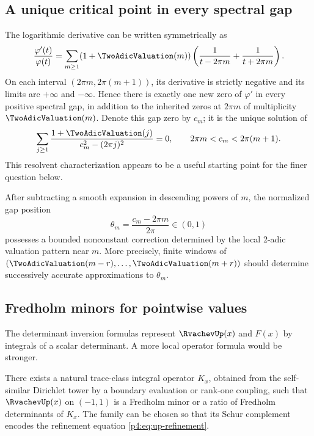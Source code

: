 \documentclass[11pt]{article}
\theoremstyle{definition}
\theoremstyle{remark}
\newcommand{\phiF}{\varphi}
\begin{document}
\subsection{A unique critical point in every spectral gap}

The logarithmic derivative can be written symmetrically as
\begin{equation}
 \frac{\phiF'(t)}{\phiF(t)}
 =\sum_{m\ge1}(1+\TwoAdicValuation(m))
 \left(\frac1{t-2\pi m}+\frac1{t+2\pi m}\right).
 \label{p4:eq:symmetric-logder}
\end{equation}
On each interval \((2\pi m,2\pi(m+1))\), its derivative is strictly negative and its
limits are \(+\infty\) and \(-\infty\).  Hence there is exactly one new zero of
\(\phiF'\) in every positive spectral gap, in addition to the inherited zeros at
\(2\pi m\) of multiplicity \(\TwoAdicValuation(m)\).  Denote this gap zero by \(c_m\); it is the
unique solution of
\begin{equation}
 \sum_{j\ge1}\frac{1+\TwoAdicValuation(j)}{c_m^2-(2\pi j)^2}=0,
 \qquad 2\pi m<c_m<2\pi(m+1).
 \label{p4:eq:cm-equation}
\end{equation}
This resolvent characterization appears to be a useful starting point for the finer
question below.

\begin{conjecture}
\label{p4:conj:derivative-zeros}
After subtracting a smooth expansion in descending powers of \(m\), the normalized
gap position
\begin{equation}
 \theta_m=\frac{c_m-2\pi m}{2\pi}\in(0,1)
 \label{p4:eq:theta-m}
\end{equation}
possesses a bounded nonconstant correction determined by the local 2-adic valuation
pattern near \(m\).  More precisely, finite windows of
\((\TwoAdicValuation(m-r),\ldots,\TwoAdicValuation(m+r))\) should determine successively accurate
approximations to \(\theta_m\).
\end{conjecture}

\subsection{Fredholm minors for pointwise values}

The determinant inversion formulas represent \(\RvachevUp(x)\) and \(F(x)\) by integrals of
a scalar determinant.  A more local operator formula would be stronger.

\begin{conjecture}
\label{p4:conj:minor}
There exists a natural trace-class integral operator \(K_x\), obtained from the
self-similar Dirichlet tower by a boundary evaluation or rank-one coupling, such that
\(\RvachevUp(x)\) on \((-1,1)\) is a Fredholm minor or a ratio of Fredholm determinants of
\(K_x\).  The family can be chosen so that its Schur complement encodes the refinement
equation \eqref{p4:eq:up-refinement}.
\end{conjecture}
\end{document}

